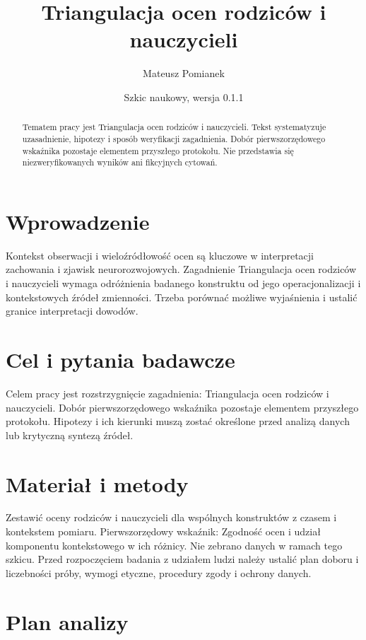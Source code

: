 \documentclass[11pt,a4paper]{article}
\title{Triangulacja ocen rodziców i nauczycieli}
\author{Mateusz Pomianek}
\date{Szkic naukowy, wersja 0.1.1}
\begin{document}
\maketitle

\begin{abstract}

Tematem pracy jest Triangulacja ocen rodziców i nauczycieli. Tekst systematyzuje uzasadnienie, hipotezy i sposób weryfikacji zagadnienia. Dobór pierwszorzędowego wskaźnika pozostaje elementem przyszłego protokołu. Nie przedstawia się niezweryfikowanych wyników ani fikcyjnych cytowań.

\end{abstract}

\section{Wprowadzenie}

Kontekst obserwacji i wieloźródłowość ocen są kluczowe w interpretacji zachowania i zjawisk neurorozwojowych. Zagadnienie Triangulacja ocen rodziców i nauczycieli wymaga odróżnienia badanego konstruktu od jego operacjonalizacji i kontekstowych źródeł zmienności. Trzeba porównać możliwe wyjaśnienia i ustalić granice interpretacji dowodów.

\section{Cel i pytania badawcze}

Celem pracy jest rozstrzygnięcie zagadnienia: Triangulacja ocen rodziców i nauczycieli. Dobór pierwszorzędowego wskaźnika pozostaje elementem przyszłego protokołu. Hipotezy i ich kierunki muszą zostać określone przed analizą danych lub krytyczną syntezą źródeł.

\section{Materiał i metody}

Zestawić oceny rodziców i nauczycieli dla wspólnych konstruktów z czasem i kontekstem pomiaru. Pierwszorzędowy wskaźnik: Zgodność ocen i udział komponentu kontekstowego w ich różnicy. Nie zebrano danych w ramach tego szkicu. Przed rozpoczęciem badania z udziałem ludzi należy ustalić plan doboru i liczebności próby, wymogi etyczne, procedury zgody i ochrony danych.

\section{Plan analizy}
\end{document}
